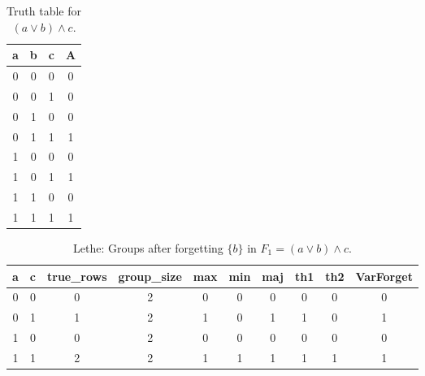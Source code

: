 \begin{table}[!tb]
    \centering
    \begin{tabular}{|c|c|c|c|}
        \hline
        \textbf{a} & \textbf{b} & \textbf{c} & \textbf{A} \\ \hline
        0 & 0 & 0 & 0 \\ \hline
        0 & 0 & 1 & 0 \\ \hline
        0 & 1 & 0 & 0 \\ \hline
        0 & 1 & 1 & 1 \\ \hline
        1 & 0 & 0 & 0 \\ \hline
        1 & 0 & 1 & 1 \\ \hline
        1 & 1 & 0 & 0 \\ \hline
        1 & 1 & 1 & 1 \\ \hline
    \end{tabular}
    \caption{Truth table for $(a \lor b) \land c$.}
    \label{tab:truthtab}
\end{table}

\begin{table}[!tb]
    \centering
    \begin{tabular}{|c|c|c|c|c|c|c|c|c|c|}
        \hline
        \textbf{a} & \textbf{c} & \textbf{true\_rows} & \textbf{group\_size} & \textbf{max} & \textbf{min} & \textbf{maj} & \textbf{th1} & \textbf{th2} & \textbf{VarForget} \\ \hline
        \rowcolor{gray!40} 0 & 0 & 0 & 2 & 0 & 0 & 0 & 0 & 0 & 0 \\ \hline
        \rowcolor{blue!40} 0 & 1 & 1 & 2 & 1 & 0 & 1 & 1 & 0 & 1 \\ \hline
        \rowcolor{red!40} 1 & 0 & 0 & 2 & 0 & 0 & 0 & 0 & 0 & 0 \\ \hline
        \rowcolor{green!40} 1 & 1 & 2 & 2 & 1 & 1 & 1 & 1 & 1 & 1 \\ \hline
    \end{tabular}
    \caption{Lethe: Groups after forgetting $\{b\}$ in $F_{1} = (a \lor b) \land c$.}
    \label{tab:lethe-F1-b-groups}
\end{table}
